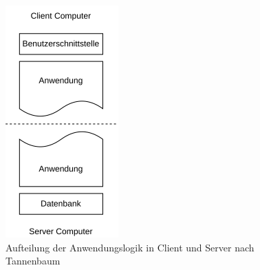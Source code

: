 \documentclass[
]{article}
\begin{document}
\begin{figure}[H]
	\centering
	\includegraphics[width=\textwidth ]{resources/server_client.pdf}
	\caption{Aufteilung der Anwendungslogik in Client und Server nach Tannenbaum}
	\label{fig:destribution-of-logic}
\end{figure}
\end{document}
